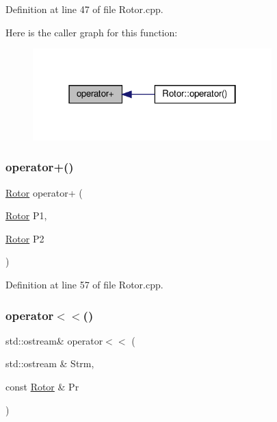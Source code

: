 Definition at line 47 of file Rotor.\+cpp.

Here is the caller graph for this function\+:
\nopagebreak
\begin{figure}[H]
\begin{center}
\leavevmode
\includegraphics[width=262pt]{_rotor_8hh_a8e627d5e28005e4dc3a7ab7ae6e21f9b_icgraph}
\end{center}
\end{figure}
\mbox{\label{_rotor_8hh_aec4621815bb6b2569f3c34689e7533a8}} 
\subsubsection{\texorpdfstring{operator+()}{operator+()}\hspace{0.1cm}{\footnotesize\ttfamily [2/2]}}
{\footnotesize\ttfamily \hyperlink{class_rotor}{Rotor} operator+ (\begin{DoxyParamCaption}\item[{\hyperlink{class_rotor}{Rotor}}]{P1,  }\item[{\hyperlink{class_rotor}{Rotor}}]{P2 }\end{DoxyParamCaption})}



Definition at line 57 of file Rotor.\+cpp.

\mbox{\label{_rotor_8hh_a6e6ce3bcc6ad0cb16d457ac8d73b3a7e}} 
\subsubsection{\texorpdfstring{operator$<$$<$()}{operator<<()}}
{\footnotesize\ttfamily std\+::ostream\& operator$<$$<$ (\begin{DoxyParamCaption}\item[{std\+::ostream \&}]{Strm,  }\item[{const \hyperlink{class_rotor}{Rotor} \&}]{Pr }\end{DoxyParamCaption})}



